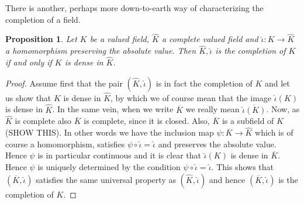 \documentclass{article}
\newtheorem{proposition}{Proposition}[section]
\begin{document}
There is another, perhaps more down-to-earth way of characterizing the completion of a field.
\begin{proposition}
    Let $K$ be a valued field, $\hat K$ a complete valued field and $\hat \iota : K \to \hat K$ a homomorphism preserving the absolute value. Then $\hat K, \hat \iota$ is the completion of $K$ if and only if $K$ is dense in $\hat K$. 
\end{proposition}
\begin{proof}
    Assume first that the pair $(\hat K, \hat \iota)$ is in fact the completion of $K$ and let us show that $K$ is dense in $\hat K$, by which we of course mean that the image $\hat \iota(K)$ is dense in $\hat K$. In the same vein, when we write $\overline K$ we really mean $\overline{\hat \iota(K)}$. Now, as $\hat K$ is complete also $\overline K$ is complete, since it is closed. Also, $\overline K$ is a subfield of $\hat K$ (SHOW THIS). In other words we have the inclusion map $\psi : \overline K \to \hat K$ which is of course a homomorphism, satisfies $\psi \circ \hat \iota = \hat \iota$ and preserves the absolute value. Hence $\psi$ is in particular continuous and it is clear that $\hat \iota (K)$ is dense in $\overline K$. Hence $\psi$ is uniquely determined by the condition $\psi \circ \hat \iota = \hat \iota$. This shows that $(\overline K, \hat \iota)$ satisfies the same universal property as $(\hat K, \hat \iota)$ and hence $(\overline K, \hat \iota)$ is the completion of $K$. 


\end{proof}
\end{document}
